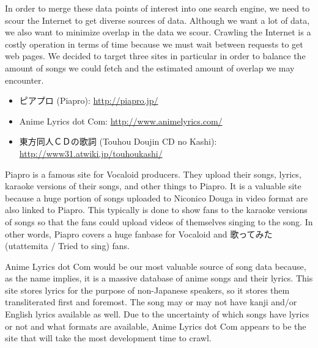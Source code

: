 \documentclass{acm} %
\begin{document}
\begin{CJK}{UTF8}{zhsong}

In order to merge these data points of interest into one search engine, we need to scour the Internet to get diverse sources of data. Although we want a lot of data, we also want to minimize overlap in the data we scour. Crawling the Internet is a costly operation in terms of time because we must wait between requests to get web pages. We decided to target three sites in particular in order to balance the amount of songs we could fetch and the estimated amount of overlap we may encounter.

\begin{itemize}                                                                                                                                                                                             
\item ピアプロ (Piapro): \url{http://piapro.jp/}
\item Anime Lyrics dot Com: \url{http://www.animelyrics.com/}
\item 東方同人ＣＤの歌詞 (Touhou Doujin CD no Kashi): \url{http://www31.atwiki.jp/touhoukashi/}
\end{itemize}

Piapro is a famous site for Vocaloid producers. They upload their songs, lyrics, karaoke versions of their songs, and other things to Piapro. It is a valuable site because a huge portion of songs uploaded to Niconico Douga in video format are also linked to Piapro. This typically is done to show fans to the karaoke versions of songs so that the fans could upload videos of themselves singing to the song. In other words, Piapro covers a huge fanbase for Vocaloid and 歌ってみた (utattemita / Tried to sing) fans.

Anime Lyrics dot Com would be our most valuable source of song data because, as the name implies, it is a massive database of anime songs and their lyrics. This site stores lyrics for the purpose of non-Japanese speakers, so it stores them transliterated first and foremost. The song may or may not have kanji and/or English lyrics available as well. Due to the uncertainty of which songs have lyrics or not and what formats are available, Anime Lyrics dot Com appears to be the site that will take the most development time to crawl.


\end{CJK}
\end{document}
